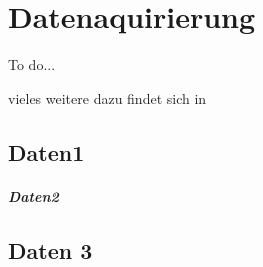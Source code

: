 \chapter[Datenaquirierung]{Datenaquirierung}
\label{chap:Datenaquirierung}


To do...

vieles weitere dazu findet sich \zB in



\section{Daten1}


\paragraph{Daten2} 




\section{Daten 3}
